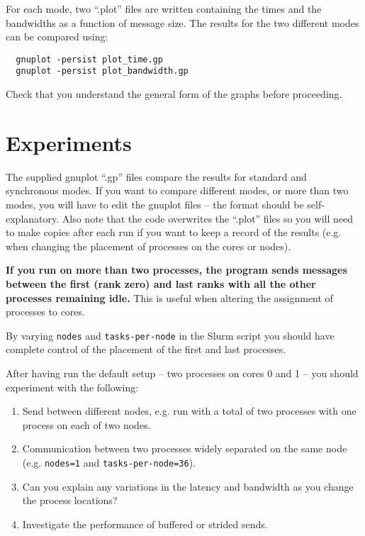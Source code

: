 \documentclass{article}
\begin{document}
For each mode, two ``.plot'' files are written containing the times and
the bandwidths as a function of message size. The results for the two
different modes can be compared using:

\begin{verbatim}
  gnuplot -persist plot_time.gp
  gnuplot -persist plot_bandwidth.gp
\end{verbatim}

Check that you understand the general form of the graphs before
proceeding.

\section{Experiments}

The supplied gnuplot ``.gp'' files compare the results for standard and
synchronous modes. If you want to compare different modes, or more than
two modes, you will have to edit the gnuplot files -- the format should
be self-explanatory. Also note that the code overwrites the ``.plot''
files so you will need to make copies after each run if you want to keep
a record of the results (e.g. when changing the placement of processes
on the cores or nodes).

{\bf If you run on more than two processes, the program sends messages
  between the first (rank zero) and last ranks with all the other
  processes remaining idle.} This is useful when altering the
assignment of processes to cores.

By varying \verb+nodes+ and \verb+tasks-per-node+ in the Slurm script
you should have complete control of the placement of the first and
last processes.

After having run the default setup -- two processes on cores 0 and 1
-- you should experiment with the following:

\begin{enumerate}

\item Send between different nodes, e.g. run with a total of two
  processes with one process on each of two nodes.

\item Communication between two processes widely separated on the same
  node (e.g.  \verb+nodes=1+ and \verb+tasks-per-node=36+).

\item Can you explain any variations in the latency and bandwidth
  as you change the process locations?

\item Investigate the performance of buffered or strided sends.

\end{enumerate}
\end{document}

